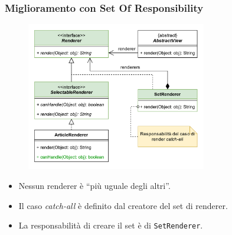 
\begin{frame}
    \frametitle{Miglioramento con Set Of Responsibility}

    \begin{figure}
        \includegraphics[width=0.7\textwidth]{img/setofresponsibility.png}
    \end{figure}
    \begin{itemize}
      \item Nessun renderer è ``più uguale degli altri''.
      \item Il caso \emph{catch-all} è definito dal creatore del set di renderer.
      \item La responsabilità di creare il set è di \texttt{SetRenderer}.
    \end{itemize}
\end{frame}


